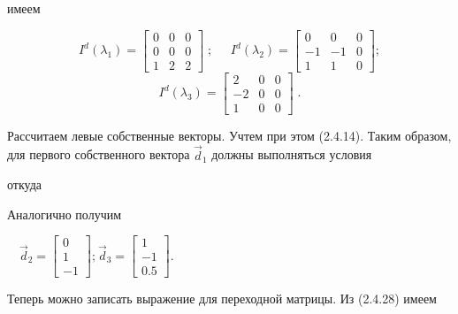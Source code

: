 		имеем


\begin{equation*}
I^d(\lambda _1)=\left[\begin{matrix}0&0&0\\0&0&0\\1&2&2\end{matrix}\right]\;;\;\;\;\;\;I^d(\lambda _2)=\left[\begin{matrix}0&0&0\\-1&-1&0\\1&1&0\end{matrix}\right];
\end{equation*}
\begin{equation*}
I^d(\lambda _3)=\left[\begin{matrix}2&0&0\\-2&0&0\\1&0&0\end{matrix}\right]\;.
\end{equation*}

		Рассчитаем левые собственные векторы. Учтем при этом (2.4.14). Таким образом, для первого собственного вектора  $\vec
		d_1$ должны выполняться условия




		откуда 






		Аналогично получим



		\ \  $\vec d_2=\left[\begin{matrix}0\\1\\-1\end{matrix}\right];_{}^{}\vec
		d_3=\left[\begin{matrix}1\\-1\\0.5\end{matrix}\right]$.



		Теперь можно записать выражение для переходной матрицы. Из (2.4.28) имеем


